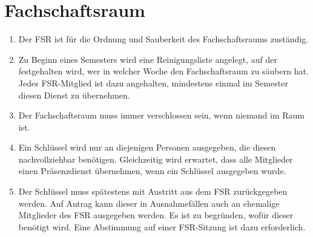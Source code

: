 \section{Fachschaftsraum}
\begin{enumerate}
	\item Der FSR ist für die Ordnung und Sauberkeit des Fachschaftsraums zuständig.
	\item Zu Beginn eines Semesters wird eine Reinigungsliste angelegt, auf der festgehalten wird, wer in welcher Woche den Fachschaftsraum zu säubern hat. Jedes FSR-Mitglied ist dazu angehalten, mindestens einmal im Semester diesen Dienst zu übernehmen.
	\item Der Fachschaftsraum muss immer verschlossen sein, wenn niemand im Raum ist.
	\item Ein Schlüssel wird nur an diejenigen Personen ausgegeben, die diesen nachvollziehbar benötigen. Gleichzeitig wird erwartet, dass alle Mitglieder einen Präsenzdienst übernehmen, wenn ein Schlüssel ausgegeben wurde.
	\item Der Schlüssel muss spätestens mit Austritt aus dem FSR zurückgegeben werden. Auf Antrag kann dieser in Ausnahmefällen auch an ehemalige Mitglieder des FSR ausgegeben werden. Es ist zu begründen, wofür dieser benötigt wird. Eine Abstimmung auf einer FSR-Sitzung ist dazu erforderlich.
\end{enumerate}

